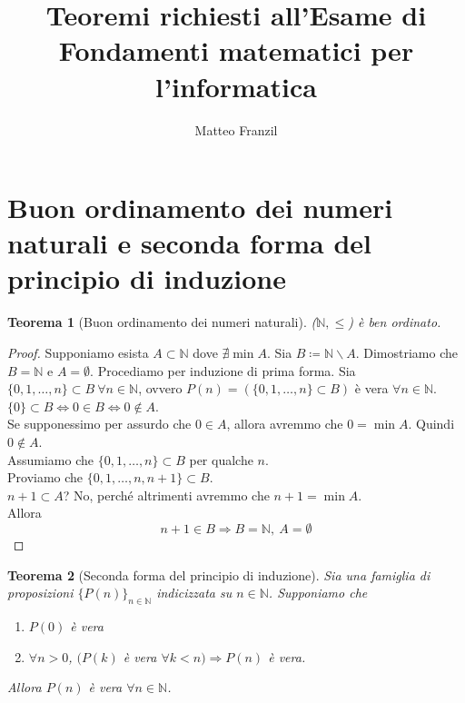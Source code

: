 \documentclass[12pt,twoscolu]{article}
\newcommand{\N}{\mathbb{N}}
\newcommand{\sesolose}{\Leftrightarrow}
\newcommand{\implica}{\Longrightarrow}
\newcommand{\nin}{\forall n\in\N}
\newcommand{\baseinduz}[1]{\newline\newline {\boldmath$n = #1$}}
\newcommand{\induzuno}[1]{\newline\newline {\boldmath$n \ge #1, n \implica n+1$}}
\newtheorem{theorem}{Teorema}
\begin{document}
 
\title{Teoremi richiesti all'Esame di\\Fondamenti matematici per l'informatica}
\author{Matteo Franzil}
\maketitle

\tableofcontents

\clearpage 

\section{Buon ordinamento dei numeri naturali e seconda forma del principio di induzione}
\begin{theorem}[Buon ordinamento dei numeri naturali]
($\mathbb{N}, \le$) è ben ordinato.
\end{theorem}
 
\begin{proof}
Supponiamo esista $A\subset\N$ dove $\nexists \min A$.
 Sia $B \coloneqq\N \backslash A$. Dimostriamo che $B = \N$ e $A = \emptyset$.
 Procediamo per induzione di prima forma. Sia $\{0, 1, \ldots ,n\} \subset B \ \forall n\in\N$, ovvero $P(n) = (\{0, 1, \ldots ,n\} \subset B)$ è vera $\nin$.
\baseinduz{0}
\\$\{0\}\subset B \sesolose 0 \in B \sesolose 0 \not\in A$.
\\Se supponessimo per assurdo che $0 \in A$, allora avremmo che $0 = \min A$. Quindi $0 \not\in A$.
\induzuno{1}
\\Assumiamo che $\{0, 1, \ldots, n\} \subset B$ per qualche $n$.
\\Proviamo che $\{0, 1, \ldots, n, n+1\} \subset B$.
\\$n+1\subset A$? No, perché altrimenti avremmo che $n+1 = \min A$.
\\Allora
$$n+1 \in B \implica B = \N, \ A = \emptyset$$
\end{proof}

\begin{theorem}[Seconda forma del principio di induzione]
Sia una famiglia di proposizioni $\{P(n)\}_{n\in\N}$ indicizzata su $n\in\N$. Supponiamo che 
\begin{enumerate}
\item $P(0)$ è vera
\item $\forall n > 0$, $(P(k) $ è vera $ \forall k < n) \implica P(n)$ è vera.
\end{enumerate}
Allora $P(n)$ è vera $\nin$.
\end{theorem}
\end{document}
